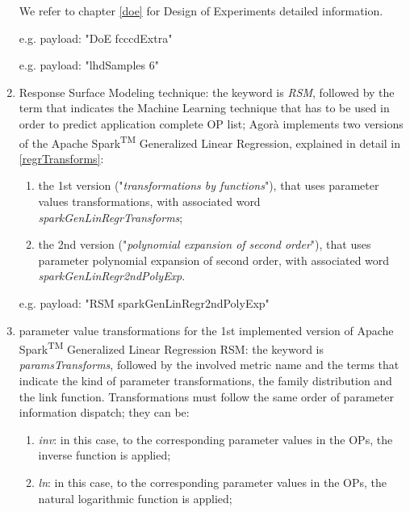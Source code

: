 \begin{enumerate}
    We refer to chapter \ref{doe} for Design of Experiments detailed information.
    
    e.g. payload: "DoE fcccdExtra"
    
    e.g. payload: "lhdSamples 6"
    
    \item Response Surface Modeling technique: the keyword is \textit{RSM}, followed by the term that indicates the Machine Learning technique that has to be used in order to predict application complete OP list; Agorà implements two versions of the Apache Spark\textsuperscript{TM} Generalized Linear Regression, explained in detail in \ref{regrTransforms}:
    
    \begin{enumerate}
    
        \item the 1st version ("\textit{transformations by functions}"), that uses parameter values transformations, with associated word \textit{sparkGenLinRegrTransforms};
        
        \item the 2nd version ("\textit{polynomial expansion of second order}"), that uses parameter polynomial expansion of second order, with associated word \textit{sparkGenLinRegr2ndPolyExp}.
    
    \end{enumerate}
    
    e.g. payload: "RSM sparkGenLinRegr2ndPolyExp"
    
    \item parameter value transformations for the 1st implemented version of Apache Spark\textsuperscript{TM} Generalized Linear Regression RSM: the keyword is \textit{paramsTransforms}, followed by the involved metric name and the terms that indicate the kind of parameter transformations, the family distribution and the link function. Transformations must follow the same order of parameter information dispatch; they can be:
    
    \begin{enumerate}
    
        \item \textit{inv}: in this case, to the corresponding parameter values in the OPs, the inverse function is applied;
        
        \item \textit{ln}: in this case, to the corresponding parameter values in the OPs, the natural logarithmic function is applied;
        

\end{enumerate}
\end{enumerate}
